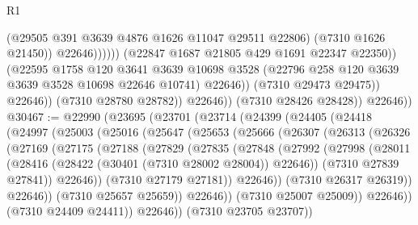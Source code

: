 \begin{lexlean}{R1}
\begin{coremodule}
                                        (@29505 @391 @3639 @4876 @1626 @11047 @29511 @22806)
                                        (@7310 @1626 @21450))
                                      @22646))))))
                          (@22847 @1687 @21805 @429 @1691 @22347 @22350))
                        (@22595
                          @1758
                          @120
                          @3641
                          @3639
                          @10698
                          @3528
                          (@22796 @258 @120 @3639 @3639 @3528 @10698 @22646 @10741)
                          @22646))
                      (@7310 @29473 @29475))
                    @22646))
                (@7310 @28780 @28782))
              @22646))
          (@7310 @28426 @28428))
        @22646))
@30467 := @22990
    (@23695
      (@23701
        (@23714
          (@24399
            (@24405
              (@24418
                (@24997
                  (@25003
                    (@25016
                      (@25647
                        (@25653
                          (@25666
                            (@26307
                              (@26313
                                (@26326
                                  (@27169
                                    (@27175
                                      (@27188
                                        (@27829
                                          (@27835
                                            (@27848
                                              (@27992
                                                (@27998
                                                  (@28011
                                                    (@28416
                                                      (@28422
                                                        (@30401 (@7310 @28002 @28004))
                                                        @22646))
                                                    (@7310 @27839 @27841))
                                                  @22646))
                                              (@7310 @27179 @27181))
                                            @22646))
                                        (@7310 @26317 @26319))
                                      @22646))
                                  (@7310 @25657 @25659))
                                @22646))
                            (@7310 @25007 @25009))
                          @22646))
                      (@7310 @24409 @24411))
                    @22646))
                (@7310 @23705 @23707))

\end{coremodule}
\end{lexlean}

